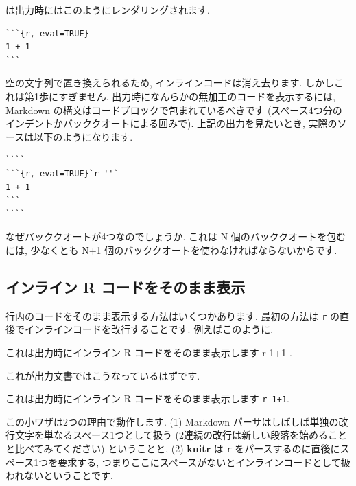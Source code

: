 \documentclass[
  11pt,
  lualatex,ja=standard,jafont=noto]{bxjsreport}
\newenvironment{Shaded}{\begin{snugshade}}{\end{snugshade}}
\newcommand{\InformationTok}[1]{\textcolor[rgb]{0.56,0.35,0.01}{\textbf{\textit{#1}}}}
\newcommand{\NormalTok}[1]{#1}
\renewenvironment{quote}{\def\FrameCommand{{\color{quotebarcolor}{\vrule width 3pt}}\hspace{10pt}}\MakeFramed{\advance\hsize-\width\FrameRestore}}{\endMakeFramed}
\begin{document}
は出力時にはこのようにレンダリングされます.

\begin{verbatim}
```{r, eval=TRUE}
1 + 1
```
\end{verbatim}

空の文字列で置き換えられるため, インラインコードは消え去ります. しかしこれは第1歩にすぎません. 出力時になんらかの無加工のコードを表示するには, Markdown の構文はコードブロックで包まれているべきです (スペース4つ分のインデントかバッククオートによる囲みで). 上記の出力を見たいとき, 実際のソースは以下のようになります.

\begin{verbatim}
````
```{r, eval=TRUE}`r ''`
1 + 1
```
````
\end{verbatim}

なぜバッククオートが4つなのでしょうか. これは N 個のバッククオートを包むには, 少なくとも N+1 個のバッククオートを使わなければならないからです.

\hypertarget{show-a-verbatim-inline-expression}{%
\subsection{インライン R コードをそのまま表示}\label{show-a-verbatim-inline-expression}}

行内のコードをそのまま表示する方法はいくつかあります. 最初の方法は \texttt{\textasciigrave{}r} の直後でインラインコードを改行することです. 例えばこのように.

\begin{Shaded}
\begin{Highlighting}[]
\NormalTok{これは出力時にインライン R コードをそのまま表示します \textasciigrave{}}\InformationTok{\textasciigrave{} \textasciigrave{}}\NormalTok{r}
\NormalTok{1+1\textasciigrave{} \textasciigrave{}\textasciigrave{}.}
\end{Highlighting}
\end{Shaded}

これが出力文書ではこうなっているはずです.

\begin{quote}
これは出力時にインライン R コードをそのまま表示します \texttt{\textasciigrave{}r\ 1+1\textasciigrave{}}.
\end{quote}

この小ワザは2つの理由で動作します. (1) Markdown パーサはしばしば単独の改行文字を単なるスペース1つとして扱う (2連続の改行は新しい段落を始めることと比べてみてください) ということと, (2) \textbf{knitr} は \texttt{\textasciigrave{}r} をパースするのに直後にスペース1つを要求する, つまりここにスペースがないとインラインコードとして扱われないということです.
\end{document}
